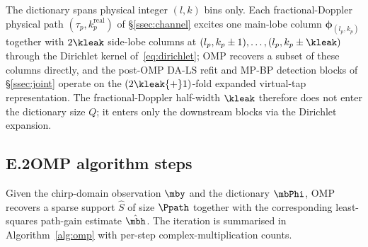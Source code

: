 The dictionary spans physical integer $(l, k)$ bins only. Each fractional-Doppler physical path $(\tau_p, k_p^\text{real})$ of \S\ref{ssec:channel} excites one main-lobe column $\boldsymbol{\phi}_{(l_p, k_p)}$ together with $2\kleak$ side-lobe columns at $(l_p, k_p \pm 1), \dots, (l_p, k_p \pm \kleak)$ through the Dirichlet kernel of~\eqref{eq:dirichlet}; OMP recovers a subset of these columns directly, and the post-OMP DA-LS refit and MP-BP detection blocks of \S\ref{ssec:joint} operate on the $(2\kleak{+}1)$-fold expanded virtual-tap representation. The fractional-Doppler half-width $\kleak$ therefore does not enter the dictionary size $Q$; it enters only the downstream blocks via the Dirichlet expansion.

\subsection*{E.2\quad OMP algorithm steps}

Given the chirp-domain observation $\mby$ and the dictionary $\mbPhi$, OMP recovers a sparse support $\hat{S}$ of size $\Ppath$ together with the corresponding least-squares path-gain estimate $\hat{\mbh}$. The iteration is summarised in Algorithm~\ref{alg:omp} with per-step complex-multiplication counts.

